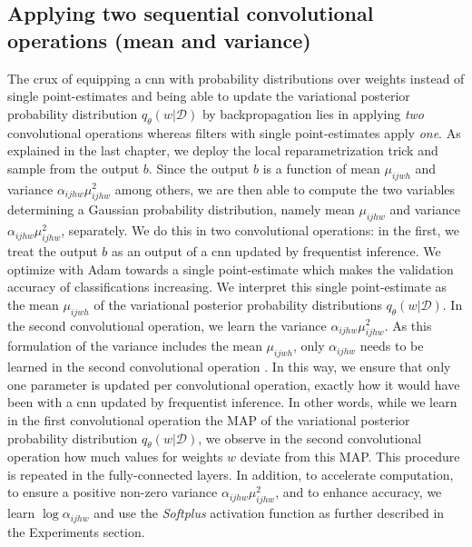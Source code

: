 \subsection{Applying two sequential convolutional operations (mean and variance)}
The crux of equipping a \ac{cnn} with probability distributions over weights instead of single point-estimates and being able to update the variational posterior probability distribution $q_{\theta}(w|\mathcal{D})$ by backpropagation lies in applying \textit{two} convolutional operations whereas filters with single point-estimates apply \textit{one}. As explained in the last chapter, we deploy the local reparametrization trick and sample from the output $b$. Since the output $b$ is a function of mean $\mu_{ijwh}$ and variance $\alpha_{ijhw}\mu^2_{ijhw}$ among others, we are then able to compute the two variables determining a Gaussian probability distribution, namely mean $\mu_{ijhw}$ and variance $\alpha_{ijhw}\mu^2_{ijhw}$, separately. 
\newline We do this in two convolutional operations: in the first, we treat the output $b$ as an output of a \ac{cnn} updated by frequentist inference. We optimize with Adam \cite{kingma2014adam} towards a single point-estimate which makes the validation accuracy of classifications increasing. We interpret this single point-estimate as the mean $\mu_{ijwh}$ of the variational posterior probability distributions $q_{\theta}(w|\mathcal{D})$. In the second convolutional operation, we learn the variance $\alpha_{ijhw}\mu^2_{ijhw}$. As this formulation of the variance includes the mean $\mu_{ijwh}$, only $\alpha_{ijhw}$ needs to be learned in the second convolutional operation \cite{molchanov2017variational}. In this way, we ensure that only one parameter is updated per convolutional operation, exactly how it would have been with a \ac{cnn} updated by frequentist inference. 
\newline In other words, while we learn in the first convolutional operation the MAP of the variational posterior probability distribution $q_{\theta}(w|\mathcal{D})$, we observe in the second convolutional operation how much values for weights $w$ deviate from this MAP. This procedure is repeated in the fully-connected layers. In addition, to accelerate computation, to ensure a positive non-zero variance $\alpha_{ijhw}\mu^2_{ijhw}$, and to enhance accuracy, we learn $\log \alpha_{ijhw}$ and use the \textit{Softplus} activation function as further described in the Experiments section.
%
